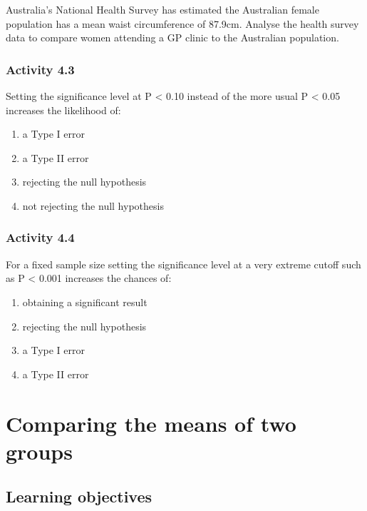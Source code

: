 \documentclass[
  a4paper,
]{memoir}
\providecommand{\tightlist}{%
  \setlength{\itemsep}{0pt}\setlength{\parskip}{0pt}}
\begin{document}
Australia's National Health Survey has estimated the Australian female
population has a mean waist circumference of 87.9cm. Analyse the health
survey data to compare women attending a GP clinic to the Australian
population.

\subsection*{Activity 4.3}\label{activity-4.3}

Setting the significance level at P \textless{} 0.10 instead of the more
usual P \textless{} 0.05 increases the likelihood of:

\begin{enumerate}
\def\labelenumi{\alph{enumi})}
\tightlist
\item
  a Type I error
\item
  a Type II error
\item
  rejecting the null hypothesis
\item
  not rejecting the null hypothesis
\end{enumerate}

\subsection*{Activity 4.4}\label{activity-4.4}

For a fixed sample size setting the significance level at a very extreme
cutoff such as P \textless{} 0.001 increases the chances of:

\begin{enumerate}
\def\labelenumi{\alph{enumi})}
\tightlist
\item
  obtaining a significant result
\item
  rejecting the null hypothesis
\item
  a Type I error
\item
  a Type II error
\end{enumerate}


\chapter{Comparing the means of two
groups}\label{comparing-the-means-of-two-groups}

\section*{Learning objectives}\label{learning-objectives-4}
\end{document}
